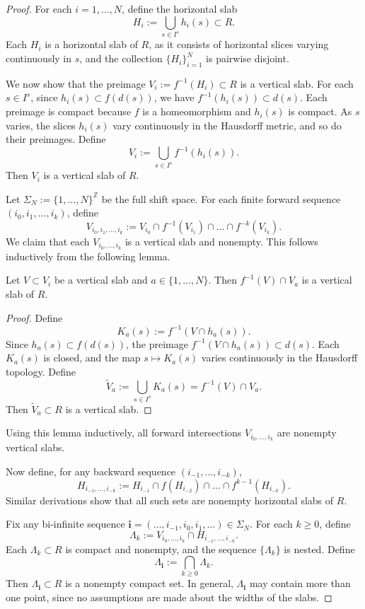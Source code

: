 \documentclass[10pt,a4paper]{amsart}
\begin{document}
\begin{proof}
For each \( i = 1, \dots, N \), define the horizontal slab
\[
H_i := \bigcup_{s \in I^s} h_i(s) \subset R.
\]
Each \( H_i \) is a horizontal slab of \( R \), as it consists of horizontal slices varying continuously in \( s \), and the collection \( \{H_i\}_{i=1}^N \) is pairwise disjoint.

We now show that the preimage \( V_i := f^{-1}(H_i) \subset R \) is a vertical slab. For each \( s \in I^s \), since \( h_i(s) \subset f(d(s)) \), we have \( f^{-1}(h_i(s)) \subset d(s) \). Each preimage is compact because \( f \) is a homeomorphism and \( h_i(s) \) is compact. As \( s \) varies, the slices \( h_i(s) \) vary continuously in the Hausdorff metric, and so do their preimages. Define
\[
V_i := \bigcup_{s \in I^s} f^{-1}(h_i(s)).
\]
Then \( V_i \) is a vertical slab of \( R \).

Let \( \Sigma_N := \{1, \dots, N\}^\mathbb{Z} \) be the full shift space. For each finite forward sequence \( (i_0, i_1, \dots, i_k) \), define
\[
V_{i_0, i_1, \dots, i_k} := V_{i_0} \cap f^{-1}(V_{i_1}) \cap \dots \cap f^{-k}(V_{i_k}).
\]
We claim that each \( V_{i_0, \dots, i_k} \) is a vertical slab and nonempty. This follows inductively from the following lemma.

\begin{lemma}
Let \( V \subset V_i \) be a vertical slab and \( a \in \{1, \dots, N\} \). Then \( f^{-1}(V) \cap V_a \) is a vertical slab of \( R \).
\end{lemma}

\begin{proof}
Define
\[
K_a(s) := f^{-1}(V \cap h_a(s)).
\]
Since \( h_a(s) \subset f(d(s)) \), the preimage \( f^{-1}(V \cap h_a(s)) \subset d(s) \). Each \( K_a(s) \) is closed, and the map \( s \mapsto K_a(s) \) varies continuously in the Hausdorff topology. Define
\[
\tilde{V}_a := \bigcup_{s \in I^s} K_a(s) = f^{-1}(V) \cap V_a.
\]
Then \( \tilde{V}_a \subset R \) is a vertical slab.
\end{proof}

Using this lemma inductively, all forward intersections \( V_{i_0, \dots, i_k} \) are nonempty vertical slabs.

Now define, for any backward sequence \( (i_{-1}, \dots, i_{-k}) \),
\[
H_{i_{-1}, \dots, i_{-k}} := H_{i_{-1}} \cap f(H_{i_{-2}}) \cap \dots \cap f^{k-1}(H_{i_{-k}}).
\]
Similar derivations show that all such sets are nonempty horizontal slabs of \( R \).

Fix any bi-infinite sequence \( \mathbf{i} = (\dots, i_{-1}, i_0, i_1, \dots) \in \Sigma_N \). For each \( k \geq 0 \), define
\[
\Lambda_k := V_{i_0, \dots, i_k} \cap H_{i_{-1}, \dots, i_{-k}}.
\]
Each \( \Lambda_k \subset R \) is compact and nonempty, and the sequence \( \{\Lambda_k\} \) is nested. Define
\[
\Lambda_{\mathbf{i}} := \bigcap_{k \geq 0} \Lambda_k.
\]
Then \( \Lambda_{\mathbf{i}} \subset R \) is a nonempty compact set. In general, \( \Lambda_{\mathbf{i}} \) may contain more than one point, since no assumptions are made about the widths of the slabs.


\end{proof}
\end{document}
